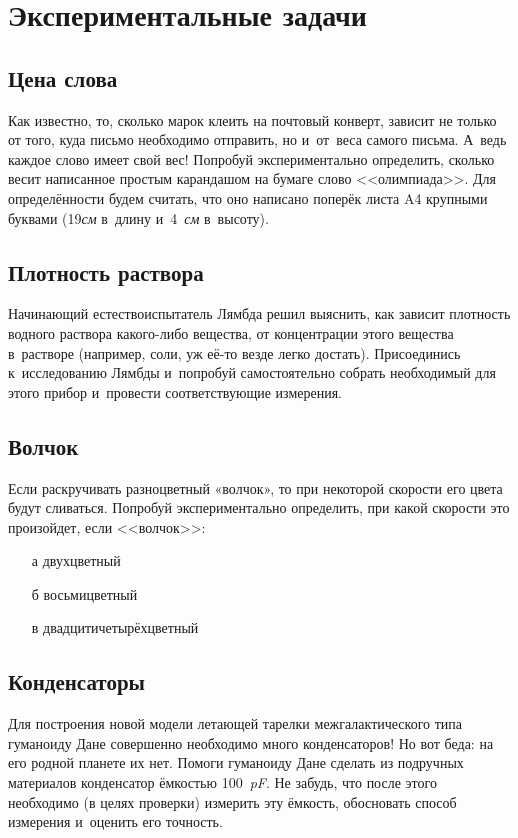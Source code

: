\documentclass[a4paper,12pt]{article}
\begin{document}
\section{Экспериментальные задачи}

\subsection{Цена слова}
Как известно, то, сколько марок клеить на почтовый конверт, зависит не только от того,
куда письмо необходимо отправить, но и~от~веса самого письма. А~ведь каждое слово имеет
свой вес! Попробуй экспериментально определить, сколько весит написанное простым
карандашом на бумаге слово <<олимпиада>>. Для определённости будем считать, что
оно написано поперёк листа A4 крупными буквами (19\emph{см} в~длину и~4~\emph{см} в~высоту).

\subsection{Плотность раствора}
Начинающий естествоиспытатель Лямбда решил выяснить, как зависит плотность
водного раствора какого-либо вещества, от концентрации этого вещества
в~растворе (например, соли, уж её-то везде легко достать). Присоединись
к~исследованию Лямбды и~попробуй самостоятельно собрать необходимый
для этого прибор и~провести соответствующие измерения.

\subsection{Волчок}
Если раскручивать разноцветный «волчок», то при некоторой скорости его цвета будут сливаться.
Попробуй экспериментально определить, при какой скорости это произойдет, если <<волчок>>:\\
\begin{enumerate}
\item[а] двухцветный
\item[б] восьмицветный
\item[в] двадцитичетырёхцветный
\end{enumerate}

\subsection{Конденсаторы}
Для построения новой модели летающей тарелки межгалактического типа гуманоиду Дане
совершенно необходимо много конденсаторов! Но вот беда: на его родной планете их нет.
Помоги гуманоиду Дане сделать из подручных материалов конденсатор ёмкостью 100~\emph{pF}.
Не забудь, что после этого необходимо (в  целях проверки) измерить эту ёмкость,
обосновать способ измерения и~оценить его точность.
\end{document}

